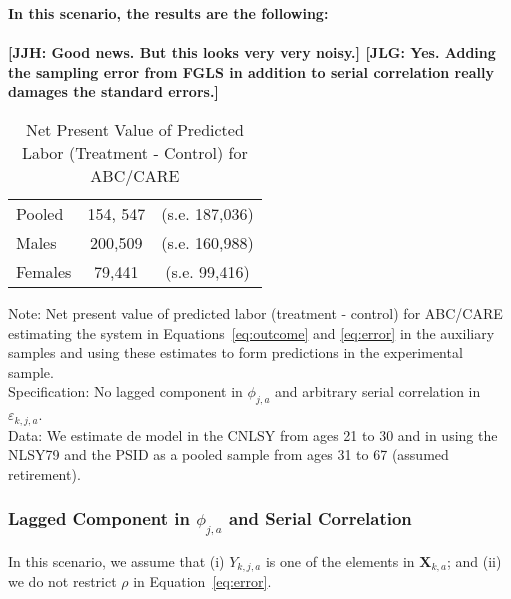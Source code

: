 \noindent \textbf{In this scenario, the results are the following:}\\ \\
\noindent \textbf{[JJH: Good news. But this looks very very noisy.] [JLG: Yes. Adding the sampling error from FGLS in addition to serial correlation really damages the standard errors.]}\\

\begin{table}[H] 
\begin{threeparttable}
\caption{Net Present Value of Predicted Labor (Treatment - Control) for ABC/CARE}
\label{table:yourlabel}
\centering 
\begin{tabular}{lcc} \toprule
Pooled & 154, 547 & (s.e. 187,036) \\
Males & 200,509  & (s.e. 160,988) \\ 
Females & 79,441 & (s.e. 99,416) \\ \bottomrule
\end{tabular}
\end{threeparttable}
\end{table}
\begin{spacing}{1}
\begin{footnotesize}
\noindent Note: Net present value of predicted labor (treatment - control) for ABC/CARE estimating the system in Equations~\eqref{eq:outcome} and \eqref{eq:error} in the auxiliary samples and using these estimates to form predictions in the experimental sample.\\ 
\noindent Specification: No lagged component in $\phi_{j,a}$ and arbitrary serial correlation in $\varepsilon_{k,j,a}$.\\ 
\noindent Data: We estimate de model in the CNLSY from ages 21 to 30 and in using the NLSY79 and the PSID as a pooled sample from ages 31 to 67 (assumed retirement). 
\end{footnotesize}
\end{spacing}



\subsubsection{Lagged Component in $\phi_{j,a}$ and Serial Correlation} \label{section:laggedserial}

\noindent In this scenario, we assume that (i)  $Y_{k,j,a}$ is one of the elements in $\bm{X}_{k,a}$; and (ii) we do not restrict $\rho$ in Equation~\eqref{eq:error}.\\

